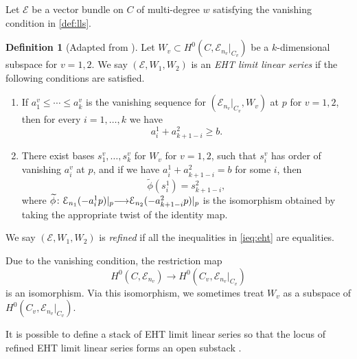 \documentclass[11pt,reqno]{amsart}
\theoremstyle{plain}
\theoremstyle{definition}
\newtheorem{definition}[theorem]{Definition}
\theoremstyle{remark}
\numberwithin{equation}{section}
\renewcommand{\to}{{\longrightarrow}}
\numberwithin{equation}{section}
\begin{document}
Let $\mathcal E$ be a vector bundle on $C$ of multi-degree $w$ satisfying the vanishing condition in \autoref{def:lls}.
\begin{definition}[{Adapted from \cite[Definition~4.1.2]{oss:14}}]
  \label{def:eht}
  Let $W_v \subset H^0(C, \mathcal E_{n_v}|_{C_v})$ be a $k$-dimensional subspace for $v = 1, 2$.
  We say  $(\mathcal E, W_1, W_2)$ is an \emph{EHT limit linear series} if the following conditions are satisfied.
  \begin{enumerate}
  \item
    \label{ieq:eht}
    If $a^v_1 \leq \cdots \leq a^v_k$ is the vanishing sequence for $(\mathcal E_{n_v}|_{C_v}, W_v)$ at $p$ for $v = 1, 2$, then for every $i = 1, \dots, k$ we have
    \[ a^1_i + a^2_{k+1-i} \geq b.\]
  \item\label{gluing:eht}
    There exist bases $s^v_1, \dots, s^v_k$ for $W_v$ for $v = 1, 2$, such that $s^v_i$ has order of vanishing $a^v_i$ at $p$, and if we have $a^1_i + a^2_{k+1-i} = b$ for some $i$, then
    \[ \widetilde \phi (s^1_i) = s^2_{k+1-i},\]
    where $\widetilde \phi \from \mathcal E_{n_1}(-a^1_{i}p)|_p \to \mathcal E_{n_2}(-a^2_{k+1-i}p) |_p$ is the isomorphism obtained by taking the appropriate twist of the identity map.
  \end{enumerate}
  We say  $(\mathcal E, W_1, W_2)$ is \emph{refined} if all the inequalities in \eqref{ieq:eht} are equalities.
\end{definition}
Due to the vanishing condition, the restriction map
\[ H^0(C, \mathcal E_{n_v}) \to H^0(C_v, \mathcal E_{n_v}|_{C_v})\]
is an isomorphism.
Via this isomorphism, we sometimes treat $W_v$ as a subspace of $H^0(C_v, \mathcal E_{n_v}|_{C_v})$.

It is possible to define a stack of EHT limit linear series so that the locus of refined EHT limit linear series forms an open substack \cite[\S~4]{oss:14}.
\end{document}
